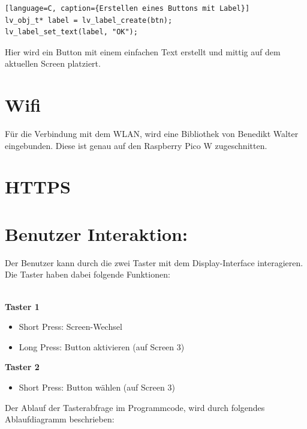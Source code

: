 \begin{inhalt}
\begin{lstlisting}[style=mytsx][language=C, caption={Erstellen eines Buttons mit Label}]
lv_obj_t* label = lv_label_create(btn);
lv_label_set_text(label, "OK");
\end{lstlisting}

Hier wird ein Button mit einem einfachen Text erstellt und mittig auf dem aktuellen Screen platziert.

\section{Wifi}

Für die Verbindung mit dem WLAN, wird eine Bibliothek von Benedikt Walter eingebunden. Diese ist genau auf den Raspberry Pico W zugeschnitten. 

\section{HTTPS}

\section{Benutzer Interaktion:}

Der Benutzer kann durch die zwei Taster mit dem Display-Interface interagieren. Die Taster haben dabei folgende Funktionen:

\bigskip \\
\noindent\textbf{Taster 1}
\begin{itemize}
    \item Short Press: Screen-Wechsel
    \item Long Press: Button aktivieren (auf Screen 3)
\end{itemize}

\noindent\textbf{Taster 2}
\begin{itemize}
    \item Short Press: Button wählen (auf Screen 3)
\end{itemize}

Der Ablauf der Tasterabfrage im Programmcode, wird durch folgendes Ablaufdiagramm beschrieben: 







\end{inhalt}